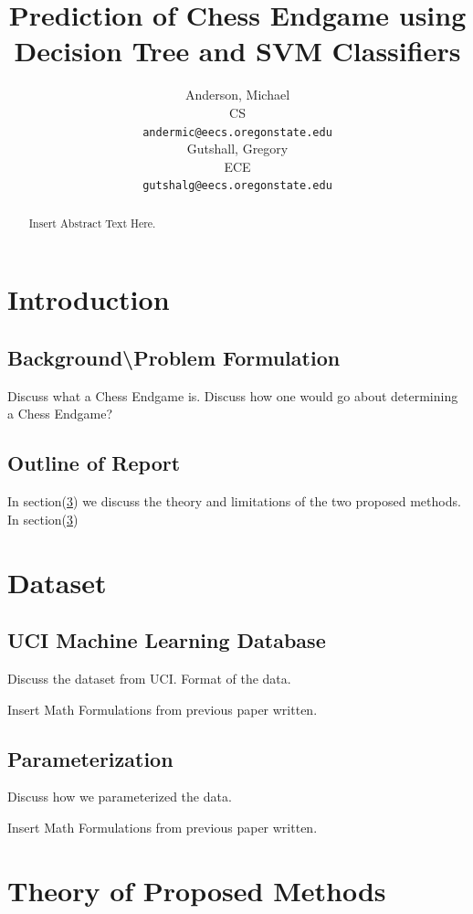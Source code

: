 \documentclass{article}
\title{Prediction of Chess Endgame using\\
Decision Tree and SVM Classifiers}
\author{
Anderson, Michael\\
CS\\ 
\texttt{andermic@eecs.oregonstate.edu} \\
\AND
Gutshall, Gregory\\
ECE\\
\texttt{gutshalg@eecs.oregonstate.edu} \\
}
\begin{document}
\maketitle

\begin{abstract}
Insert Abstract Text Here.
\end{abstract}

\section{Introduction}
\label{sec:Intro}
%
\subsection[Background]{Background\textbackslash Problem Formulation}
\label{subsec:Background}
Discuss what a Chess Endgame is.  Discuss how one would go about determining a Chess Endgame?  
%
\subsection{Outline of Report}
\label{subsec:outline}
In section(\ref{sec:ClassficationMethods}) we discuss the theory and limitations of the two proposed methods.  In section(\ref{sec:ClassficationMethods})

\section{Dataset}
\label{sec:Dataset}

\subsection{UCI Machine Learning Database}
\label{subsec:dataset}
Discuss the dataset from UCI.  Format of the data.

Insert Math Formulations from previous paper written.

\subsection{Parameterization}
\label{subsec:Parameterization}
Discuss how we parameterized the data.

Insert Math Formulations from previous paper written.

\section{Theory of Proposed Methods}
\label{sec:ClassficationMethods}
\end{document}
